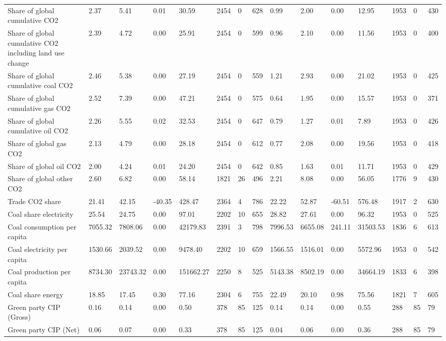\begin{longtable}{lllllllllllllll}
Share of global cumulative CO2 & 2.37 & 5.41 & 0.01 & 30.59 & 2454 & 0 & 628 & 0.99 & 2.00 & 0.00 & 12.95 & 1953 & 0 & 430\\
Share of global cumulative CO2 including land use change & 2.39 & 4.72 & 0.00 & 25.91 & 2454 & 0 & 599 & 0.96 & 2.10 & 0.00 & 11.56 & 1953 & 0 & 400\\
Share of global cumulative coal CO2 & 2.46 & 5.38 & 0.00 & 27.19 & 2454 & 0 & 559 & 1.21 & 2.93 & 0.00 & 21.02 & 1953 & 0 & 425\\
Share of global cumulative gas CO2 & 2.52 & 7.39 & 0.00 & 47.21 & 2454 & 0 & 575 & 0.64 & 1.95 & 0.00 & 15.57 & 1953 & 0 & 371\\
\addlinespace
Share of global cumulative oil CO2 & 2.26 & 5.55 & 0.02 & 32.53 & 2454 & 0 & 647 & 0.79 & 1.27 & 0.01 & 7.89 & 1953 & 0 & 426\\
Share of global gas CO2 & 2.13 & 4.79 & 0.00 & 28.18 & 2454 & 0 & 612 & 0.77 & 2.08 & 0.00 & 19.56 & 1953 & 0 & 418\\
Share of global oil CO2 & 2.00 & 4.24 & 0.01 & 24.20 & 2454 & 0 & 642 & 0.85 & 1.63 & 0.01 & 11.71 & 1953 & 0 & 429\\
Share of global other CO2 & 2.60 & 6.82 & 0.00 & 58.14 & 1821 & 26 & 496 & 2.21 & 8.08 & 0.00 & 56.05 & 1776 & 9 & 430\\
Trade CO2 share & 21.41 & 42.15 & -40.35 & 428.47 & 2364 & 4 & 786 & 22.22 & 52.87 & -60.51 & 576.48 & 1917 & 2 & 630\\
\addlinespace
Coal share electricity & 25.54 & 24.75 & 0.00 & 97.01 & 2202 & 10 & 655 & 28.82 & 27.61 & 0.00 & 96.32 & 1953 & 0 & 525\\
Coal consumption per capita & 7055.32 & 7808.06 & 0.00 & 42179.83 & 2391 & 3 & 798 & 7996.53 & 6655.08 & 241.11 & 31503.53 & 1836 & 6 & 613\\
Coal electricity per capita & 1530.66 & 2039.52 & 0.00 & 9478.40 & 2202 & 10 & 659 & 1566.55 & 1516.01 & 0.00 & 5572.96 & 1953 & 0 & 542\\
Coal production per capita & 8734.30 & 23743.32 & 0.00 & 151662.27 & 2250 & 8 & 525 & 5143.38 & 8502.19 & 0.00 & 34664.19 & 1833 & 6 & 398\\
Coal share energy & 18.85 & 17.45 & 0.30 & 77.16 & 2304 & 6 & 755 & 22.49 & 20.10 & 0.98 & 75.56 & 1821 & 7 & 605\\
\addlinespace
Green party CIP (Gross) & 0.16 & 0.14 & 0.00 & 0.50 & 378 & 85 & 125 & 0.14 & 0.14 & 0.00 & 0.55 & 288 & 85 & 79\\
Green party CIP (Net) & 0.06 & 0.07 & 0.00 & 0.33 & 378 & 85 & 125 & 0.04 & 0.06 & 0.00 & 0.36 & 288 & 85 & 79\\

\end{longtable}
